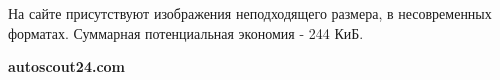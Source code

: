 На сайте присутствуют изображения неподходящего размера, в несовременных форматах. Суммарная потенциальная экономия - 244 КиБ.

\textbf{autoscout24.com}
\bigskip

\noindent
\begin{minipage}{\linewidth}
\end{minipage}
\bigskip

\noindent
\begin{minipage}{\linewidth}
\end{minipage}
\bigskip

